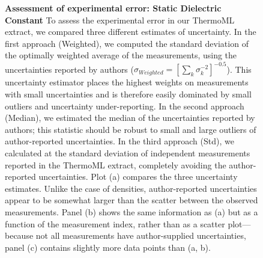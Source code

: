 \documentclass[aps,pre,twocolumn,nofootinbib,superscriptaddress,linenumbers]{revtex4-1}
\begin{document}
\begin{figure}



\caption{{\bf Assessment of experimental error: Static Dielectric Constant}
To assess the experimental error in our ThermoML extract, we compared three different estimates of uncertainty.  
In the first approach (Weighted), we computed the standard deviation of the optimally weighted average of the measurements, using the uncertainties reported by authors ($\sigma_{Weighted} = [\sum_k \sigma_k^{-2}]^{-0.5}$).
This uncertainty estimator places the highest weights on measurements with small uncertainties and is therefore easily dominated by small outliers and uncertainty under-reporting.
In the second approach (Median), we estimated the median of the uncertainties reported by authors; this statistic should be robust to small and large outliers of author-reported uncertainties.
In the third approach (Std), we calculated at the standard deviation of independent measurements reported in the ThermoML extract, completely avoiding the author-reported uncertainties.
Plot (a) compares the three uncertainty estimates.
Unlike the case of densities, author-reported uncertainties appear to be somewhat larger than the scatter between the observed measurements.
Panel (b) shows the same information as (a) but as a function of the measurement index, rather than as a scatter plot---because not all measurements have author-supplied uncertainties, panel (c) contains slightly more data points than (a, b).  
}
\label{figure:ErrorAnalysisDielectric}

\end{figure}
\end{document}
